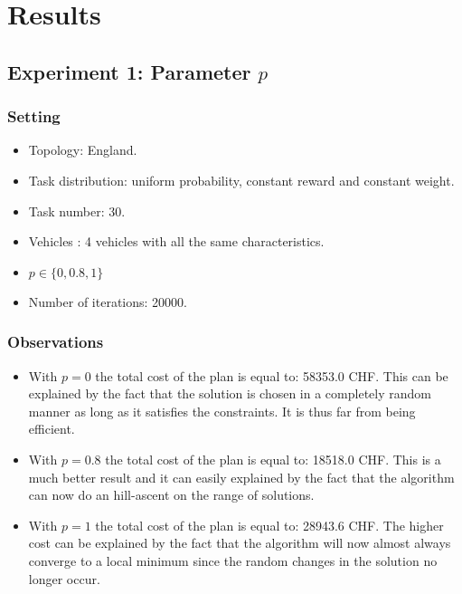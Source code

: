 \documentclass[11pt]{article}
\begin{document}
\section{Results}

\subsection{Experiment 1: Parameter $p$}

\subsubsection{Setting}
\begin{itemize}
\item Topology: England.
\item Task distribution: uniform probability, constant reward and constant
  weight.
\item Task number: 30.
\item Vehicles : 4 vehicles with all the same characteristics.
\item $p \in \{0, 0.8, 1\}$
\item Number of iterations: 20000.
\end{itemize}

\subsubsection{Observations}
\begin{itemize}
\item With $p = 0$ the total cost of the plan is equal to: 58353.0 CHF. This can
be explained by the fact that the solution is chosen in a completely random
manner as long as it satisfies the constraints. It is thus far from being
efficient.

\item With $p = 0.8$ the total cost of the plan is equal to: 18518.0 CHF. This
  is a much better result and it can easily explained by the fact that the
  algorithm can now do an hill-ascent on the range of solutions.

\item With $p = 1$ the total cost of the plan is equal to: 28943.6 CHF. The
  higher cost can be explained by the fact that the algorithm will now almost
  always converge to a local minimum since the random changes in the solution no
  longer occur.
\end{itemize}
\end{document}
